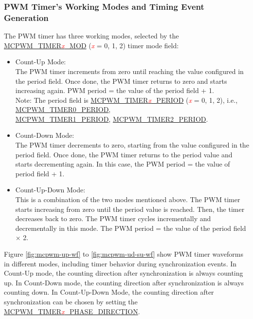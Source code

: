 \documentclass[main\_\_EN.tex]{subfiles}
\begin{document}
\subsubsection{PWM Timer's Working Modes and Timing Event Generation} 
\label{sec:mcpwm-modes-and-event-generation}

The PWM timer has three working modes, selected by the \hyperref[fielddesc:MCPWMTIMER0MOD]{MCPWM\_TIMER\textcolor{red}{\it{x}}\_MOD} (\textcolor{red}{\it{x}} = 0, 1, 2) timer mode field: 
\begin{itemize}
    \item Count-Up Mode: \\
    The PWM timer increments from zero until reaching the value configured in the period field. Once done, the PWM timer returns to zero and starts increasing again. PWM period = the value of the period field + 1.\\
    Note: The period field is \hyperref[fielddesc:MCPWMTIMER0PERIOD]{MCPWM\_TIMER\textcolor{red}{\it{x}}\_PERIOD} (\textcolor{red}{\it{x}} = 0, 1, 2), i.e., \hyperref[fielddesc:MCPWMTIMER0PERIOD]{MCPWM\_TIMER0\_PERIOD},\\ \hyperref[fielddesc:MCPWMTIMER1PERIOD]{MCPWM\_TIMER1\_PERIOD}, \hyperref[fielddesc:MCPWMTIMER2PERIOD]{MCPWM\_TIMER2\_PERIOD}.
    \item Count-Down Mode: \\
    The PWM timer decrements to zero, starting from the value configured in the period field. Once done, the PWM timer returns to the period value and starts decrementing again. In this case, the PWM period = the value of period field + 1.
    \item Count-Up-Down Mode: \\
    This is a combination of the two modes mentioned above. The PWM timer starts increasing from zero until the period value is reached. Then, the timer decreases back to zero. The PWM timer cycles incrementally and decrementally in this mode. The PWM period = the value of the period field × 2.
\end{itemize}

Figure \ref{fig:mcpwm-up-wf} to \ref{fig:mcpwm-ud-su-wf} show PWM timer waveforms in different modes, including timer behavior during synchronization events. In Count-Up mode, the counting direction after synchronization is always counting up. In Count-Down mode, the counting direction after synchronization is always counting down. In Count-Up-Down Mode, the counting direction after synchronization can be chosen by setting the \hyperref[fielddesc:MCPWMTIMER0PHASEDIRECTION]{MCPWM\_TIMER\textcolor{red}{\it{x}}\_PHASE\_DIRECTION}.
\end{document}
